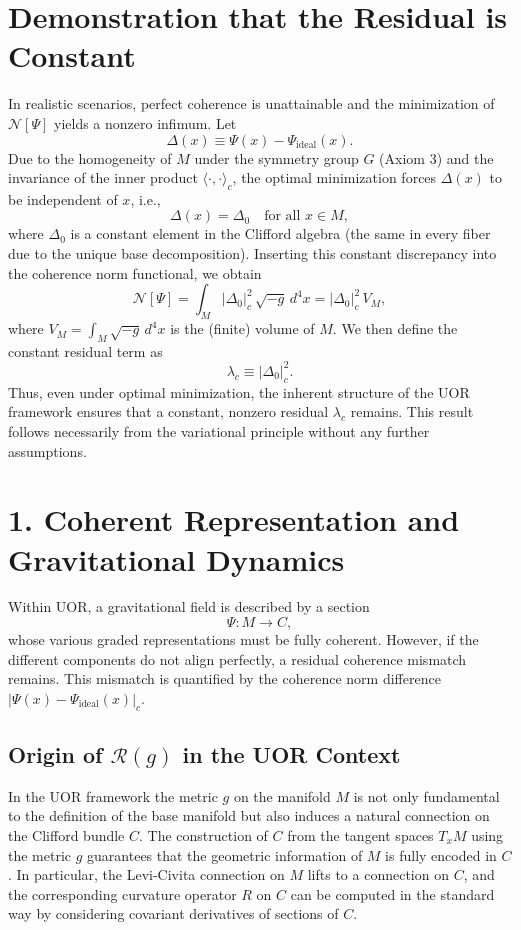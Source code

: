 \documentclass[12pt]{article}
\begin{document}
\section*{Demonstration that the Residual is Constant}
In realistic scenarios, perfect coherence is unattainable and the minimization of \(\mathcal{N}[\Psi]\) yields a nonzero infimum. Let
\[
\Delta(x) \equiv \Psi(x) - \Psi_{\mathrm{ideal}}(x).
\]
Due to the homogeneity of \(M\) under the symmetry group \(G\) (Axiom 3) and the invariance of the inner product \(\langle \cdot, \cdot \rangle_c\), the optimal minimization forces \(\Delta(x)\) to be independent of \(x\), i.e.,
\[
\Delta(x) = \Delta_0 \quad \text{for all } x \in M,
\]
where \(\Delta_0\) is a constant element in the Clifford algebra (the same in every fiber due to the unique base decomposition). Inserting this constant discrepancy into the coherence norm functional, we obtain
\[
\mathcal{N}[\Psi] = \int_M \lvert \Delta_0 \rvert_c^2 \, \sqrt{-g}\, d^4x 
= \lvert \Delta_0 \rvert_c^2 \, V_M,
\]
where \(V_M = \int_M \sqrt{-g}\, d^4x\) is the (finite) volume of \(M\). We then define the constant residual term as
\[
\lambda_c \equiv \lvert \Delta_0 \rvert_c^2.
\]
Thus, even under optimal minimization, the inherent structure of the UOR framework ensures that a constant, nonzero residual \(\lambda_c\) remains. This result follows necessarily from the variational principle without any further assumptions.

\section*{1. Coherent Representation and Gravitational Dynamics}
Within UOR, a gravitational field is described by a section 
\[
\Psi: M \to C,
\]
whose various graded representations must be fully coherent. However, if the different components do not align perfectly, a residual coherence mismatch remains. This mismatch is quantified by the coherence norm difference \(\lvert \Psi(x) - \Psi_{\mathrm{ideal}}(x) \rvert_c\).

\subsection*{Origin of \(\mathcal{R}(g)\) in the UOR Context}
In the UOR framework the metric \(g\) on the manifold \(M\) is not only fundamental to the definition of the base manifold but also induces a natural connection on the Clifford bundle \(C\). The construction of \(C\) from the tangent spaces \(T_xM\) using the metric \(g\) guarantees that the geometric information of \(M\) is fully encoded in \(C\). In particular, the Levi-Civita connection on \(M\) lifts to a connection on \(C\), and the corresponding curvature operator \(R\) on \(C\) can be computed in the standard way by considering covariant derivatives of sections of \(C\). 
\end{document}
